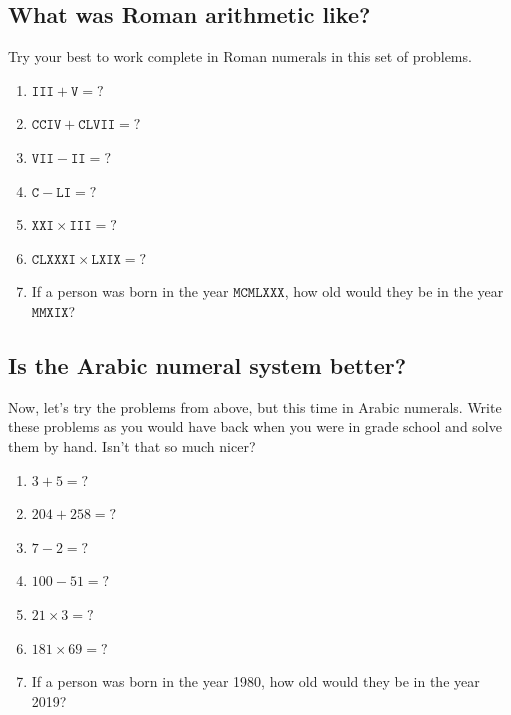 \documentclass{article}
\begin{document}
\subsection*{What was Roman arithmetic like?}
Try your best to work complete in Roman numerals in this set of problems.
\begin{enumerate}
    \item $\mathtt{III} + \mathtt{V} = ?$
    \item $\mathtt{CCIV} + \mathtt{CLVII} = ?$
    \item $\mathtt{VII} - \mathtt{II} = ?$
    \item $\mathtt{C} - \mathtt{LI} = ?$
    \item $\mathtt{XXI} \times \mathtt{III} = ?$
    \item $\mathtt{CLXXXI} \times \mathtt{LXIX} = ?$
    \item If a person was born in the year $\mathtt{MCMLXXX}$, how old would they
      be in the year $\mathtt{MMXIX}$?
\end{enumerate}

\subsection*{Is the Arabic numeral system better?}
Now, let's try the problems from above, but this time in Arabic numerals.  Write 
these problems as you would have back when you were in grade school and solve them
by hand.  Isn't that so much nicer?
\begin{enumerate}[resume]
    \item $3+5=?$
    \item $204 + 258=?$
    \item $7 - 2 = ?$
    \item $100 - 51 = ?$
    \item $21 \times 3 = ?$
    \item $181 \times 69 = ?$
    \item If a person was born in the year 1980, how old would they be in the year 2019?
\end{enumerate}
\end{document}
